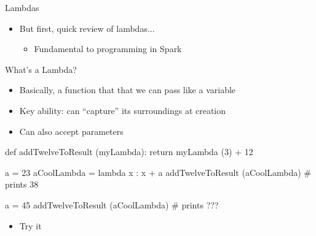 \documentclass[aspectratio=169]{beamer}
\begin{document}

\begin{frame}[fragile]{Lambdas}

\begin{itemize}
\item But first, quick review of lambdas...
	\begin{itemize}
        \item Fundamental to programming in Spark
	\end{itemize}
\end{itemize}
\end{frame}

\begin{frame}[fragile]{What's a Lambda?}

\begin{itemize}
\item Basically, a function that that we can pass like a variable
\item Key ability: can ``capture'' its surroundings at creation
\item Can also accept parameters
\end{itemize}

\begin{SQL}
def addTwelveToResult (myLambda):
     return myLambda (3) + 12

a = 23
aCoolLambda = lambda x : x + a
addTwelveToResult (aCoolLambda) # prints 38

a = 45
addTwelveToResult (aCoolLambda) # prints ??? 
\end{SQL}
\begin{itemize}
\item Try it
\end{itemize}
\end{frame}

\end{document}
